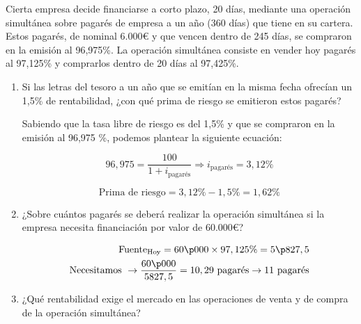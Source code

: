 Cierta empresa decide financiarse a corto plazo, 20 días, mediante una operación simultánea sobre pagarés de empresa a un año (360 días) que tiene en su cartera. Estos pagarés, de nominal 6.000€ y que vencen dentro de 245 días, se compraron en la emisión al 96,975\%. La operación simultánea consiste en vender hoy pagarés al 97,125\% y comprarlos dentro de 20 días al 97,425\%.

\begin{enumerate}[label=\textbf{\alph*)}]
    \item Si las letras del tesoro a un año que se emitían en la misma fecha ofrecían un 1,5\% de rentabilidad, ¿con qué prima de riesgo se emitieron estos pagarés?
    
    Sabiendo que la tasa libre de riesgo es del 1,5\% y que se compraron en la emisión al 96,975 \%, podemos plantear la siguiente ecuación:


    \begin{equation*}
        96,975 = \frac{100}{1 + i_{\text{pagarés}}} \Rightarrow i_{\text{pagarés}} = 3,12\%
    \end{equation*}

    \[\text{Prima de riesgo} = 3,12\% - 1,5\% = 1,62\%\]


    \item ¿Sobre cuántos pagarés se deberá realizar la operación simultánea si la empresa necesita financiación por valor de 60.000€?
    
    \begin{align*}
        \text{Fuente}_{\text{Hoy}} = 60\p000 \times 97,125\% = 5\p827,5 \\
        \text{Necesitamos } \rightarrow \frac{60\p000}{5827,5} = 10,29 \text{ pagarés} \rightarrow 11 \text{ pagarés}
    \end{align*}

    \item ¿Qué rentabilidad exige el mercado en las operaciones de venta y de compra de la operación simultánea?
    

\end{enumerate}
